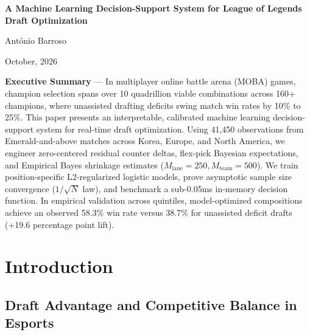 \documentclass[11pt,letterpaper]{article}
\begin{document}
\enlargethispage{3\baselineskip}
\begin{center}
{\Large \textbf{A Machine Learning Decision-Support System for League of Legends Draft Optimization}\par}
\vspace{0.3em}
{\normalsize António Barroso\par}
\vspace{0.18em}
{\normalsize October, 2026\par}
\end{center}
\vspace{-0.25em}

\noindent\parbox{\textwidth}{\small\textbf{Executive Summary} --- In multiplayer online battle arena (MOBA) games, champion selection spans over 10 quadrillion viable combinations across 160+ champions, where unassisted drafting deficits swing match win rates by 10\% to 25\%. This paper presents an interpretable, calibrated machine learning decision-support system for real-time draft optimization. Using 41,450 observations from Emerald-and-above matches across Korea, Europe, and North America, we engineer zero-centered residual counter deltas, flex-pick Bayesian expectations, and Empirical Bayes shrinkage estimates ($M_{\text{lane}}=250, M_{\text{team}}=500$). We train position-specific L2-regularized logistic models, prove asymptotic sample size convergence ($1/\sqrt{N}$ law), and benchmark a sub-0.05ms in-memory decision function. In empirical validation across quintiles, model-optimized compositions achieve an observed 58.3\% win rate versus 38.7\% for unassisted deficit drafts (+19.6 percentage point lift).}
\vspace{0.25em}

\section{Introduction}

\subsection{Draft Advantage and Competitive Balance in Esports}
\end{document}

